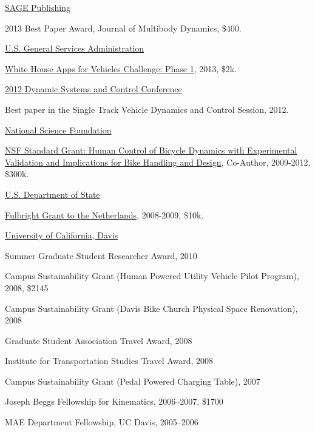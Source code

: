 \documentclass[10pt]{article}
\newenvironment{innerlist}[1][\enskip\textbullet]%
        {\begin{compactitem}[#1]}{\end{compactitem}}
\newcommand{\blankline}{\quad\pagebreak[2]}
\begin{document}
\blankline

\href{http://sagepub.com/}{SAGE Publishing}
\begin{innerlist}
  \item 2013 Best Paper Award, Journal of Multibody Dynamics, \$400.
\end{innerlist}

\blankline

\href{http://gsa.gov/}{U.S. General Services Administration}
\begin{innerlist}
  \item \href{http://appsforvehicles.challenge.gov/}{White House Apps for
    Vehicles Challenge: Phase 1}, 2013, \$2k.
\end{innerlist}

\blankline

\href{http://mne.psu.edu/dscc2012/}{2012 Dynamic Systems and Control Conference}
\begin{innerlist}
  \item Best paper in the Single Track Vehicle Dynamics and Control Session,
    2012.
\end{innerlist}

\blankline

\href{http://nsf.gov/}{National Science Foundation}
\begin{innerlist}
  \item \href{http://nsf.gov/awardsearch/showAward.do?AwardNumber=0928339}{NSF
    Standard Grant: Human Control of Bicycle Dynamics with Experimental
    Validation and Implications for Bike Handling and Design}, Co-Author,
    2009-2012, \$300k.
\end{innerlist}

\blankline

\href{http://exchanges.state.gov/}{U.S. Department of State}
\begin{innerlist}
  \item \href{http://fulbright.state.gov/}{Fulbright Grant to the Netherlands},
    2008-2009, \$10k.
\end{innerlist}

\blankline

\href{http://www.ucdavis.edu}{University of California, Davis}
\begin{innerlist}
  \item Summer Graduate Student Researcher Award, 2010
  \item Campus Sustainability Grant (Human Powered Utility Vehicle Pilot
    Program), 2008, \$2145
  \item Campus Sustainability Grant (Davis Bike Church Physical Space Renovation), 2008
  \item Graduate Student Association Travel Award, 2008
  \item Institute for Transportation Studies Travel Award, 2008
  \item Campus Sustainability Grant (Pedal Powered Charging Table), 2007
  \item Joseph Beggs Fellowship for Kinematics, 2006--2007, \$1700
  \item MAE Department Fellowship, UC Davis, 2005--2006
\end{innerlist}
\end{document}
